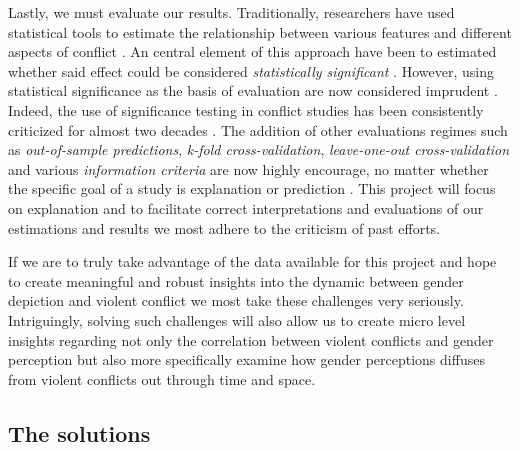 \documentclass[a4paper]{article}
\begin{document}
Lastly, we must evaluate our results. Traditionally, researchers have used statistical tools to estimate the relationship between various features and different aspects of conflict \citep[8]{chadefaux2017conflict}. An central element of this approach have been to estimated whether said effect could be considered \emph{statistically significant} \citep[363-364]{Ward_Greenhill_Bakke_2010}. However, using statistical significance as the basis of evaluation are now considered imprudent \citep{Ward_Greenhill_Bakke_2010, Schrodt_2014, chadefaux2017conflict}. Indeed, the use of significance testing in conflict studies has been consistently criticized for almost two decades \citep{king_zeng_2001b, Ward_Greenhill_Bakke_2010, Goldstone_2010, Schrodt_2014, chadefaux2017conflict}. The addition of other evaluations regimes such as \emph{out-of-sample predictions}, \emph{k-fold cross-validation}, \emph{leave-one-out cross-validation} and various \emph{information criteria} are now highly encourage, no matter whether the specific goal of a study is explanation or prediction \citep{Ward_Greenhill_Bakke_2010, Schrodt_2014, Mcelreath_2018}. This project will focus on explanation and to facilitate correct interpretations and evaluations of our estimations and results we most adhere to the criticism of past efforts.\par 

If we are to truly take advantage of the data available for this project and hope to create meaningful and robust insights into the dynamic between gender depiction and violent conflict we most take these challenges very seriously. Intriguingly, solving such challenges will also allow us to create micro level insights regarding not only the correlation between violent conflicts and gender perception but also more specifically examine how gender perceptions diffuses from violent conflicts out through time and space.\par


\subsection{The solutions}
\end{document}
